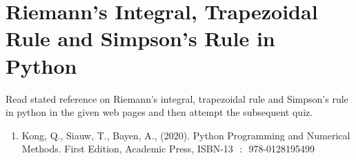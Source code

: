 \section{Riemann's Integral, Trapezoidal Rule and Simpson's Rule in Python}
\activities
Read stated reference on Riemann's integral, trapezoidal rule and Simpson's rule in python in the given web pages and then attempt the subsequent quiz.
\begin{activity}[\cg Reading]
\begin{enumerate}
\item Kong, Q., Siauw, T., Bayen, A., (2020). Python Programming and Numerical Methods. First Edition, Academic Press,  ISBN-13 ‏ : ‎ 978-0128195499 \\
\\
\end{enumerate}
\end{activity}
%



%
%
%
%
%
%
%
%
%



%


